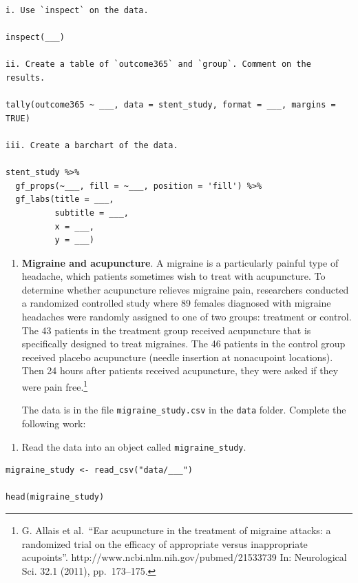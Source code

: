 \documentclass[
  letterpaper,
  DIV=11,
  numbers=noendperiod]{scrreprt}
\providecommand{\tightlist}{%
  \setlength{\itemsep}{0pt}\setlength{\parskip}{0pt}}\usepackage{longtable,booktabs,array}
\begin{document}
\begin{verbatim}
i. Use `inspect` on the data.  

inspect(___)

ii. Create a table of `outcome365` and `group`. Comment on the results.  

tally(outcome365 ~ ___, data = stent_study, format = ___, margins = TRUE)

iii. Create a barchart of the data.  

stent_study %>%
  gf_props(~___, fill = ~___, position = 'fill') %>%
  gf_labs(title = ___,
          subtitle = ___,
          x = ___,
          y = ___)
\end{verbatim}

\begin{enumerate}
\def\labelenumi{\arabic{enumi}.}
\setcounter{enumi}{1}
\item
  \textbf{Migraine and acupuncture}. A migraine is a particularly
  painful type of headache, which patients sometimes wish to treat with
  acupuncture. To determine whether acupuncture relieves migraine pain,
  researchers conducted a randomized controlled study where 89 females
  diagnosed with migraine headaches were randomly assigned to one of two
  groups: treatment or control. The 43 patients in the treatment group
  received acupuncture that is specifically designed to treat migraines.
  The 46 patients in the control group received placebo acupuncture
  (needle insertion at nonacupoint locations). Then 24 hours after
  patients received acupuncture, they were asked if they were pain
  free.\footnote{G. Allais et al.~``Ear acupuncture in the treatment of
    migraine attacks: a randomized trial on the efficacy of appropriate
    versus inappropriate acupoints''.
    http://www.ncbi.nlm.nih.gov/pubmed/21533739 In: Neurological Sci.
    32.1 (2011), pp.~173--175.}

  The data is in the file \texttt{migraine\_study.csv} in the
  \texttt{data} folder. Complete the following work:
\end{enumerate}

\begin{enumerate}
\def\labelenumi{\alph{enumi}.}
\tightlist
\item
  Read the data into an object called \texttt{migraine\_study}.
\end{enumerate}

\begin{verbatim}
migraine_study <- read_csv("data/___")

head(migraine_study)
\end{verbatim}
\end{document}
